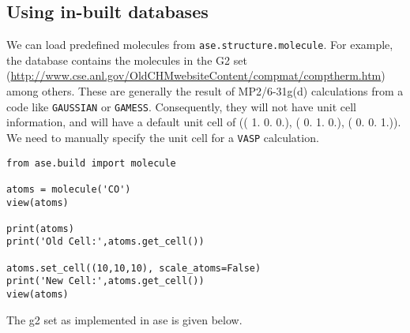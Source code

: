 \documentclass[11pt]{article}
\begin{document}
\subsection{Using in-built databases}
\label{sec:org0cbdc14}

We can load predefined molecules from \texttt{ase.structure.molecule}. For example, the database contains the molecules in the G2 set (\url{http://www.cse.anl.gov/OldCHMwebsiteContent/compmat/comptherm.htm}) among others. These are generally the result of MP2/6-31g(d) calculations from a code like \texttt{GAUSSIAN} or \texttt{GAMESS}. Consequently, they will not have unit cell information, and will have a default unit cell of  (( 1.  0.  0.), ( 0.  1.  0.), ( 0.  0.  1.)). We need to manually specify the unit cell for a \texttt{VASP} calculation.

\begin{verbatim}
from ase.build import molecule

atoms = molecule('CO')
view(atoms)

print(atoms)
print('Old Cell:',atoms.get_cell())

atoms.set_cell((10,10,10), scale_atoms=False)
print('New Cell:',atoms.get_cell())
view(atoms)
\end{verbatim}

The g2 set as implemented in ase is given below.
\end{document}
